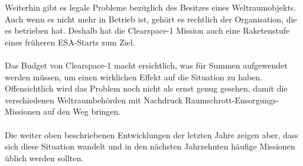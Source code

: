 \documentclass{article}
\begin{document}
Weiterhin gibt es legale Probleme bezüglich des Besitzes eines Weltraumobjekts. Auch wenn es nicht mehr in Betrieb ist, gehört es rechtlich der Organisation, die es betrieben hat. Deshalb hat die Clearspace-1 Mission auch eine Raketenstufe eines früheren ESA-Starts zum Ziel. \\\\
Das Budget von Clearspace-1 macht ersichtlich, was für Summen aufgewendet werden müssen, um einen wirklichen Effekt auf die Situation zu haben. Offensichtlich wird das Problem noch nicht als ernst genug gesehen, damit die verschiedenen Weltraumbehörden mit Nachdruck Raumschrott-Ensorgungs-Missionen auf den Weg bringen. \\\\
Die weiter oben beschriebenen Entwicklungen der letzten Jahre zeigen aber, dass sich diese Situation wandelt und in den nächsten Jahrzehnten häufige Missionen üblich werden sollten.
\end{document}
